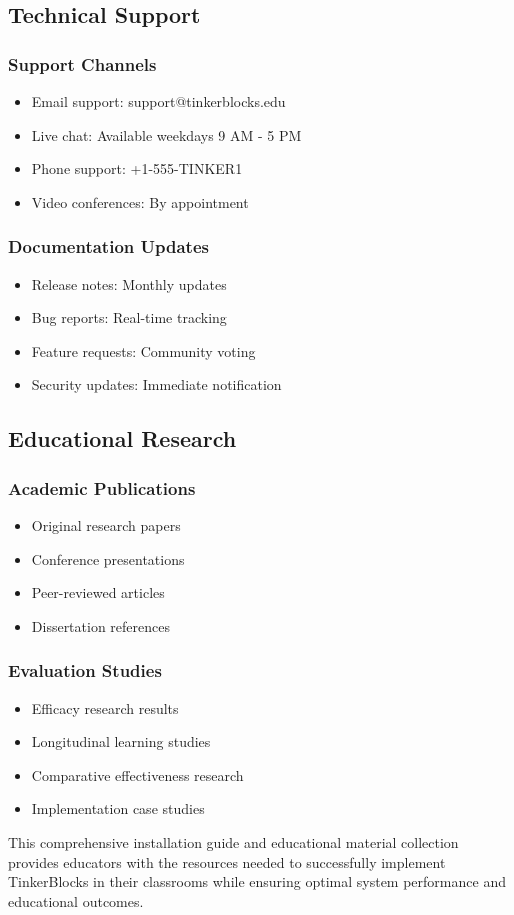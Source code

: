 \subsection{Technical Support}

\subsubsection{Support Channels}
\begin{itemize}
    \item Email support: support@tinkerblocks.edu
    \item Live chat: Available weekdays 9 AM - 5 PM
    \item Phone support: +1-555-TINKER1
    \item Video conferences: By appointment
\end{itemize}

\subsubsection{Documentation Updates}
\begin{itemize}
    \item Release notes: Monthly updates
    \item Bug reports: Real-time tracking
    \item Feature requests: Community voting
    \item Security updates: Immediate notification
\end{itemize}

\subsection{Educational Research}

\subsubsection{Academic Publications}
\begin{itemize}
    \item Original research papers
    \item Conference presentations
    \item Peer-reviewed articles
    \item Dissertation references
\end{itemize}

\subsubsection{Evaluation Studies}
\begin{itemize}
    \item Efficacy research results
    \item Longitudinal learning studies
    \item Comparative effectiveness research
    \item Implementation case studies
\end{itemize}

This comprehensive installation guide and educational material collection provides educators with the resources needed to successfully implement TinkerBlocks in their classrooms while ensuring optimal system performance and educational outcomes.